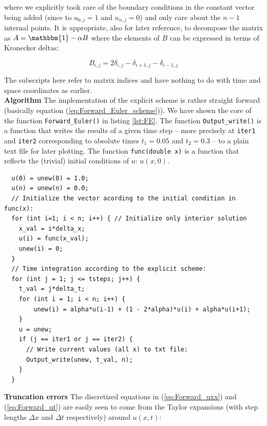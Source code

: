 \documentclass[a4paper, 11pt, notitlepage,english]{article}
\newcommand{\id}{\mathbbm{1}}
\begin{document}
where we explicitly took care of the boundary conditions in the constant vector being added (since to $u_{0,j} = 1$ and $u_{n,j} = 0$) and only care about the $n-1$ internal points. It is appropriate, also for later reference, to decompose the matrix as $A = \id - \alpha B$ where the elements of $B$ can be expressed in terms of Kronecker deltas: 

\begin{equation}
B_{i,j} = 2\delta_{i,j}-\delta_{i+1,j}-\delta_{i-1,j}
\label{eq:Matrix_B}
\end{equation}

The subscripts here refer to matrix indices and have nothing to do with time and space coordinates as earlier. \\

\textbf{Algorithm} \newline
The implementation of the explicit scheme is rather straight forward (basically equation (\ref{eq:Forward_Euler_scheme})). We have shown the core of the function \texttt{Forward\_Euler()} in listing \ref{lst:FE}. The function \texttt{Output\_write()} is a function that writes the results of a given time step – more precisely at \texttt{iter1} and \texttt{iter2} corresponding to absolute times $t_1 = 0.05$ and $t_2 = 0.3$ – to a plain text file for later plotting. The function \texttt{func(double x)} is a function that reflects the (trivial) initial conditions of $u$: $u(x,0)$.

\begin{center}
\begin{lstlisting}
  u(0) = unew(0) = 1.0;
  u(n) = unew(n) = 0.0;
  // Initialize the vector acording to the initial condition in func(x):
  for (int i=1; i < n; i++) { // Initialize only interior solution
  	x_val = i*delta_x;
  	u(i) = func(x_val);
  	unew(i) = 0;
  }
  // Time integration according to the explicit scheme:
  for (int j = 1; j <= tsteps; j++) {
  	t_val = j*delta_t;
  	for (int i = 1; i < n; i++) {
  		unew(i) = alpha*u(i-1) + (1 - 2*alpha)*u(i) + alpha*u(i+1);
  	}
  	u = unew;
  	if (j == iter1 or j == iter2) {
  	  // Write current values (all x) to txt file:
  	  Output_write(unew, t_val, n);
    }
  }
\end{lstlisting}
\end{center}

\textbf{Truncation errors} \newline
The discretized equations in (\ref{eq:Forward_uxx}) and (\ref{eq:Forward_ut}) are easily seen to come from the Taylor expansions (with step lengths $\Delta x$ and $\Delta t$ respectively) around $u(x,t)$:
\end{document}
